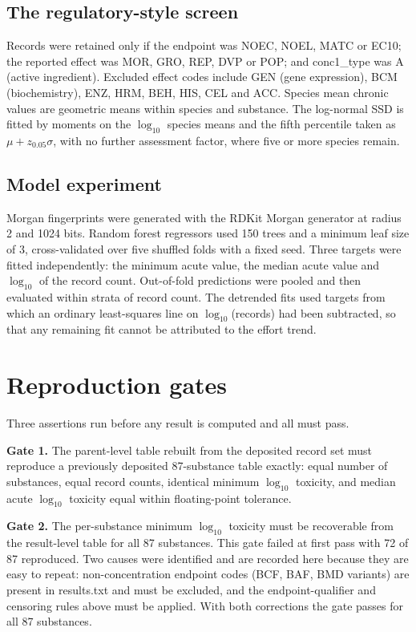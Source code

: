 \documentclass[preprint,11pt]{elsarticle}
\begin{document}
\subsection{The regulatory-style screen}
Records were retained only if the endpoint was \textsf{NOEC}, \textsf{NOEL},
\textsf{MATC} or \textsf{EC10}; the reported effect was \textsf{MOR},
\textsf{GRO}, \textsf{REP}, \textsf{DVP} or \textsf{POP}; and
\textsf{conc1\_type} was \textsf{A} (active ingredient). Excluded effect codes
include \textsf{GEN} (gene expression), \textsf{BCM} (biochemistry),
\textsf{ENZ}, \textsf{HRM}, \textsf{BEH}, \textsf{HIS}, \textsf{CEL} and
\textsf{ACC}. Species mean chronic values are geometric means within species
and substance. The log-normal SSD is fitted by moments on the $\log_{10}$
species means and the fifth percentile taken as
$\mu + z_{0.05}\sigma$, with no further assessment factor, where five or more
species remain.

\subsection{Model experiment}
Morgan fingerprints were generated with the RDKit Morgan generator at radius 2
and 1024 bits. Random forest regressors used 150 trees and a minimum leaf size
of 3, cross-validated over five shuffled folds with a fixed seed. Three targets
were fitted independently: the minimum acute value, the median acute value and
$\log_{10}$ of the record count. Out-of-fold predictions were pooled and then
evaluated within strata of record count. The detrended fits used targets from
which an ordinary least-squares line on $\log_{10}$(records) had been
subtracted, so that any remaining fit cannot be attributed to the effort trend.

\section{Reproduction gates}

Three assertions run before any result is computed and all must pass.

\textbf{Gate 1.} The parent-level table rebuilt from the deposited record set
must reproduce a previously deposited 87-substance table exactly: equal number
of substances, equal record counts, identical minimum $\log_{10}$ toxicity, and
median acute $\log_{10}$ toxicity equal within floating-point tolerance.

\textbf{Gate 2.} The per-substance minimum $\log_{10}$ toxicity must be
recoverable from the result-level table for all 87 substances. This gate failed
at first pass with 72 of 87 reproduced. Two causes were identified and are
recorded here because they are easy to repeat: non-concentration endpoint codes
(\textsf{BCF}, \textsf{BAF}, \textsf{BMD} variants) are present in
\textsf{results.txt} and must be excluded, and the endpoint-qualifier and
censoring rules above must be applied. With both corrections the gate passes for
all 87 substances.
\end{document}
